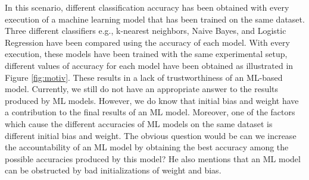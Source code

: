 In this scenario, different classification accuracy has been obtained with every execution of a machine learning model that has been trained on the same dataset. Three different classifiers e.g., k-nearest neighbors, Naive Bayes, and Logistic Regression have been compared using the accuracy of each model. With every execution, these models have been trained with the same experimental setup, different values of accuracy for each model have been obtained as illustrated in Figure \ref{fig:motiv}. These results in a lack of trustworthiness of an ML-based model. Currently, we still do not have an appropriate answer to the results produced by ML models. However, we do know that initial bias and weight have a contribution to the final results of an ML model. Moreover, one of the factors which cause the different accuracies of ML models on the same dataset is different initial bias and weight. The obvious question would be can we increase the accountability of an ML model by obtaining the best accuracy among the possible accuracies produced by this model? He\etal \cite{he2015delving} also mentions that an ML model can be obstructed by bad initializations of weight and bias. 
